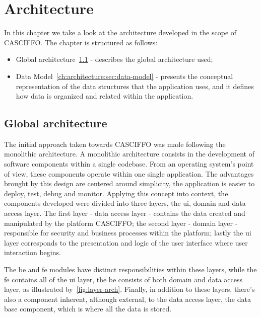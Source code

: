 % 
%
\chapter{Architecture}\label{ch:architecture}
In this chapter we take a look at the architecture developed in the scope of CASCIFFO.
The chapter is structured as follows:
\begin{itemize}
    \item Global architecture~\ref{ch:architecture:sec:global-arch} - describes the global architecture used;
    \item Data Model~\ref{ch:architecture:sec:data-model} - presents the conceptual representation of the data structures that the application uses, and it defines how data is organized and related within the application.
\end{itemize}


\section{Global architecture}\label{ch:architecture:sec:global-arch}
The initial approach taken towards CASCIFFO was made following the monolithic architecture. A monolithic architecture consists in the development of software components within a single codebase. From an operating system's point of view, these components operate within one single application. The advantages brought by this design are centered around simplicity, the application is easier to deploy, test, debug and monitor. 
Applying this concept into context, the components developed were divided into three layers, the \acrshort{ui}, domain and data access layer. The first layer - data access layer - contains the data created and manipulated by the platform CASCIFFO; the second layer - domain layer - responsible for security and business processes within the platform; lastly the \acrshort{ui} layer corresponds to the presentation and logic of the user interface where user interaction begins.

The \acrlong{be} and \acrlong{fe} modules have distinct responsibilities within these layers, while the \acrshort{fe} contains all of the \acrshort{ui} layer, the \acrshort{be} consists of both domain and data access layer, as illustrated by~\ref{fig:layer-arch}. Finally, in addition to these layers, there's also a component inherent, although external, to the data access layer, the data base component, which is where all the data is stored.

